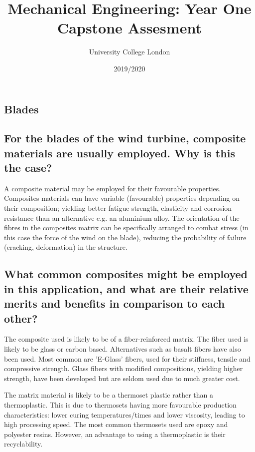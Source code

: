 \documentclass[12pt]{article}
\newcommand{\citeprimsec}[2]{\citep[][cited by \citealp{#2}]{#1}}
\numberwithin{equation}{section}
\begin{document}
\title{Mechanical Engineering: Year One Capstone Assesment}
\date{2019/2020}
\author{University College London}
\maketitle
\begin{flushleft}

\section{Blades}
\subsection{For the blades of the wind turbine, composite materials are usually employed. Why is this the case?}
A composite material may be employed for their favourable properties. Composites materials can have variable (favourable) properties depending on their composition; yielding better fatigue strength, elasticity and corrosion resistance than an alternative e.g. an aluminium alloy. The orientation of the fibres in the composites matrix can be specifically arranged to combat stress (in this case the force of the wind on the blade), reducing the probability of failure (cracking, deformation) in the structure.

\subsection{What common composites might be employed in this application, and what are their relative merits and benefits in comparison to each other?}
The composite used is likely to be of a fiber-reinforced matrix. The fiber used is likely to be glass or carbon based. Alternatives such as basalt fibers have also been used. Most common are 'E-Glass' fibers, used for their stiffness, tensile and compressive strength. Glass fibers with modified compositions, yielding higher strength, have been developed but are seldom used due to much greater cost.

The matrix material is likely to be a thermoset plastic rather than a thermoplastic. This is due to thermosets having more favourable production characteristics: lower curing temperatures/times and lower viscosity, leading to high processing speed. The most common thermosets used are epoxy and polyester resins. However, an advantage to using a thermoplastic is their recyclability. \citeprimsec{windTurbineMaterial2}{windTurbineMaterial} 


\end{flushleft}
\end{document}
